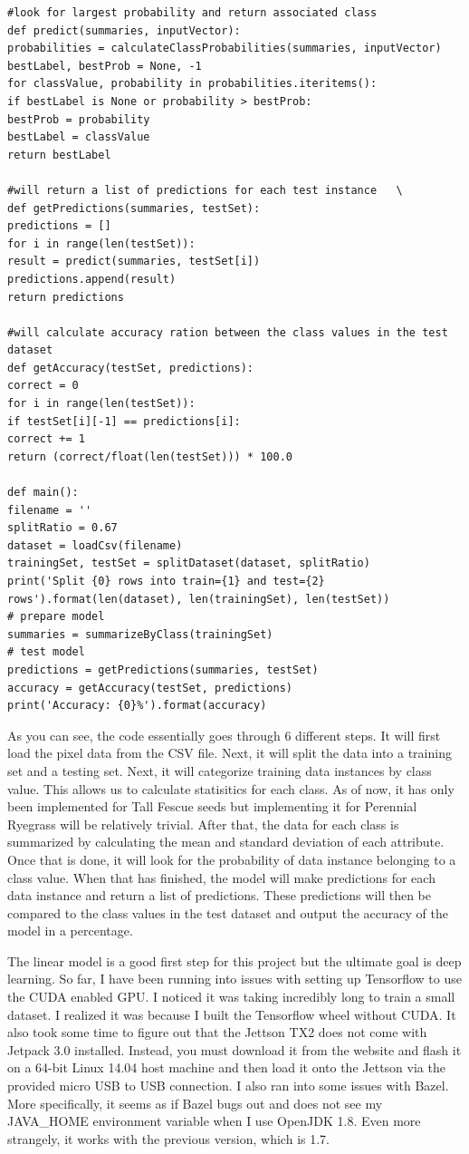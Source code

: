 \documentclass[onecolumn, draftclsnofoot,10pt, compsoc]{IEEEtran}
\begin{document}
\begin{lstlisting}
#look for largest probability and return associated class
def predict(summaries, inputVector):
probabilities = calculateClassProbabilities(summaries, inputVector)
bestLabel, bestProb = None, -1
for classValue, probability in probabilities.iteritems():
if bestLabel is None or probability > bestProb:
bestProb = probability
bestLabel = classValue
return bestLabel

#will return a list of predictions for each test instance 	\
def getPredictions(summaries, testSet):
predictions = []
for i in range(len(testSet)):
result = predict(summaries, testSet[i])
predictions.append(result)
return predictions

#will calculate accuracy ration between the class values in the test dataset 
def getAccuracy(testSet, predictions):
correct = 0
for i in range(len(testSet)):
if testSet[i][-1] == predictions[i]:
correct += 1
return (correct/float(len(testSet))) * 100.0

def main():
filename = ''
splitRatio = 0.67
dataset = loadCsv(filename)
trainingSet, testSet = splitDataset(dataset, splitRatio)
print('Split {0} rows into train={1} and test={2} rows').format(len(dataset), len(trainingSet), len(testSet))
# prepare model
summaries = summarizeByClass(trainingSet)
# test model
predictions = getPredictions(summaries, testSet)
accuracy = getAccuracy(testSet, predictions)
print('Accuracy: {0}%').format(accuracy)
\end{lstlisting}
As you can see, the code essentially goes through 6 different steps. It will first load the pixel data from the CSV file. Next, it will split the data into a training set and a testing set. Next, it will categorize training data instances by class value. This allows us to calculate statisitics for each class. As of now, it has only been implemented for Tall Fescue seeds but implementing it for Perennial Ryegrass will be relatively trivial. After that, the data for each class is summarized by calculating the mean and standard deviation of each attribute. Once that is done, it will look for the probability of data instance belonging to a class value. When that has finished, the model will make predictions for each data instance and return a list of predictions. These predictions will then be compared to the class values in the test dataset and output the accuracy of the model in a percentage.

The linear model is a good first step for this project but the ultimate goal is deep learning. So far, I have been running into issues with setting up Tensorflow to use the CUDA enabled GPU. I noticed it was taking incredibly long to train a small dataset. I realized it was because I built the Tensorflow wheel without CUDA. It also took some time to figure out that the Jettson TX2 does not come with Jetpack 3.0 installed. Instead, you must download it from the website and flash it on a 64-bit Linux 14.04 host machine and then load it onto the Jettson via the provided micro USB to USB connection. I also ran into some issues with Bazel. More specifically, it seems as if Bazel bugs out and does not see my JAVA\_HOME environment variable when I use OpenJDK 1.8. Even more strangely, it works with the previous version, which is 1.7. 
\end{document}
